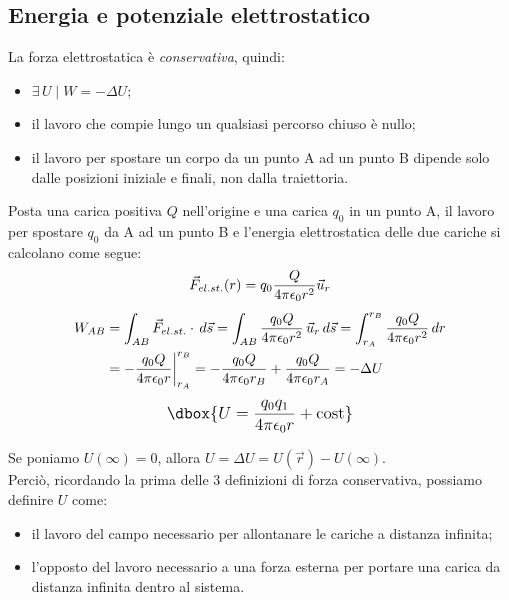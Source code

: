 \documentclass[a4paper,12pt,titlepage,openany]{book}
\theoremstyle{mydef}
\newcommand\dboxed[1]{\mathlarger{\dbox{\ensuremath{#1}}}}  %
\begin{document}
            \subsection{Energia e potenziale elettrostatico}
            La forza elettrostatica è \emph{conservativa}, quindi:
            \begin{itemize}
                \item{$\exists\,U\mid W=-\Delta U$;}
                \item{il lavoro che compie lungo un qualsiasi percorso chiuso è nullo;} 
                \item{il lavoro per spostare un corpo da un punto A ad un punto B dipende
                      solo dalle posizioni iniziale e finali, non dalla traiettoria.}
            \end{itemize}
            Posta una carica positiva $Q$ nell'origine e una carica $q_0$ in un punto A, il lavoro per spostare
            $q_0$ da A ad un punto B e l'energia elettrostatica delle due cariche si calcolano come segue:
            \begin{gather}
            \vec{F}_{el.st.}(r) = q_0\frac{Q}{4\pi\epsilon_0r^2}\vec{u}_r \notag \\[1ex]
            \begin{aligned}
            W_{AB} &= \int_{AB}\vec{F}_{el.st.}\cdot\,d\vec{s}
            = \int_{AB}\frac{q_0Q}{4\pi\epsilon_0r^2}\,\vec{u}_r\,d\vec{s}
            = \int_{r_A}^{r_B}\frac{q_0Q}{4\pi\epsilon_0r^2}\,dr \\
            &= -\frac{q_0Q}{4\pi\epsilon_0r}\biggr\rvert_{r_A}^{r_B}
            = -\frac{q_0Q}{4\pi\epsilon_0r_B} + \frac{q_0Q}{4\pi\epsilon_0r_A} = -\Delta U
            \end{aligned}
            \notag\\[1ex]
            \dboxed{U = \frac{q_0q_1}{4\pi\epsilon_0r} + \text{cost}}
            \end{gather}


            Se poniamo $U(\infty) = 0$, allora $U = \Delta U = U(\vec{r})-U(\infty)$.\\
            Perciò, ricordando la prima delle 3 definizioni di forza conservativa, possiamo definire $U$ come:
            \begin{itemize}
                \item{il lavoro del campo necessario per allontanare le cariche a distanza infinita;}
                \item{l'opposto del lavoro necessario a una forza esterna per portare una carica da distanza infinita dentro al sistema.}
            \end{itemize}
            
\end{document}
